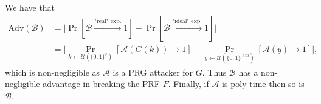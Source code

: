\documentclass[./main]{subfiles}
\begin{document}
\begin{prv}
    We have that 
    \begin{align*}
      \mathrm{Adv}(\mathcal{B}) &= \big| \Pr[\mathcal{B} \xrightarrow{\text{"real" exp.}} 1] - \Pr[\mathcal{B} \xrightarrow{\text{"ideal" exp.}} 1]  \big|\\
                                &= \big| \Pr_{k \gets \mathcal{U}(\{0,1\}^s)}[\mathcal{A}(G(k)) \to 1] - \Pr_{y \gets \mathcal{U}(\{0,1\}^{\ell m})}[\mathcal{A}(y) \to 1]\big|
    ,\end{align*}
    which is non-negligible as $\mathcal{A}$ is a PRG attacker for $G$.
    Thus $\mathcal{B}$ has a non-negligible advantage in breaking the PRF $F$.
    Finally, if $\mathcal{A}$ is poly-time then so is  $\mathcal{B}$.
  \end{prv}
\end{document}
